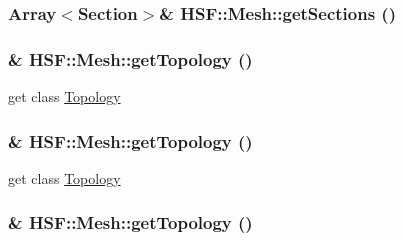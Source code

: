 \label{classHSF_1_1Mesh_a4c3c5c8a8ccd5413c01c05592863a5ea}
\hypertarget{classHSF_1_1Mesh_a4c3c5c8a8ccd5413c01c05592863a5ea}{
\subsubsection[{getSections}]{\setlength{\rightskip}{0pt plus 5cm}Array$<${\bf Section}$>$\& HSF::Mesh::getSections ()}}
\label{classHSF_1_1Mesh_a4c3c5c8a8ccd5413c01c05592863a5ea}
\hypertarget{classHSF_1_1Mesh_a3a340c548e7bf152dc70722cb64ab61c}{
\subsubsection[{getTopology}]{\& HSF::Mesh::getTopology ()}}
\label{classHSF_1_1Mesh_a3a340c548e7bf152dc70722cb64ab61c}


get class \hyperlink{classHSF_1_1Topology}{Topology} \hypertarget{classHSF_1_1Mesh_a3a340c548e7bf152dc70722cb64ab61c}{
\subsubsection[{getTopology}]{\& HSF::Mesh::getTopology ()}}
\label{classHSF_1_1Mesh_a3a340c548e7bf152dc70722cb64ab61c}


get class \hyperlink{classHSF_1_1Topology}{Topology} \hypertarget{classHSF_1_1Mesh_a3a340c548e7bf152dc70722cb64ab61c}{
\subsubsection[{getTopology}]{\& HSF::Mesh::getTopology ()}}
\label{classHSF_1_1Mesh_a3a340c548e7bf152dc70722cb64ab61c}


